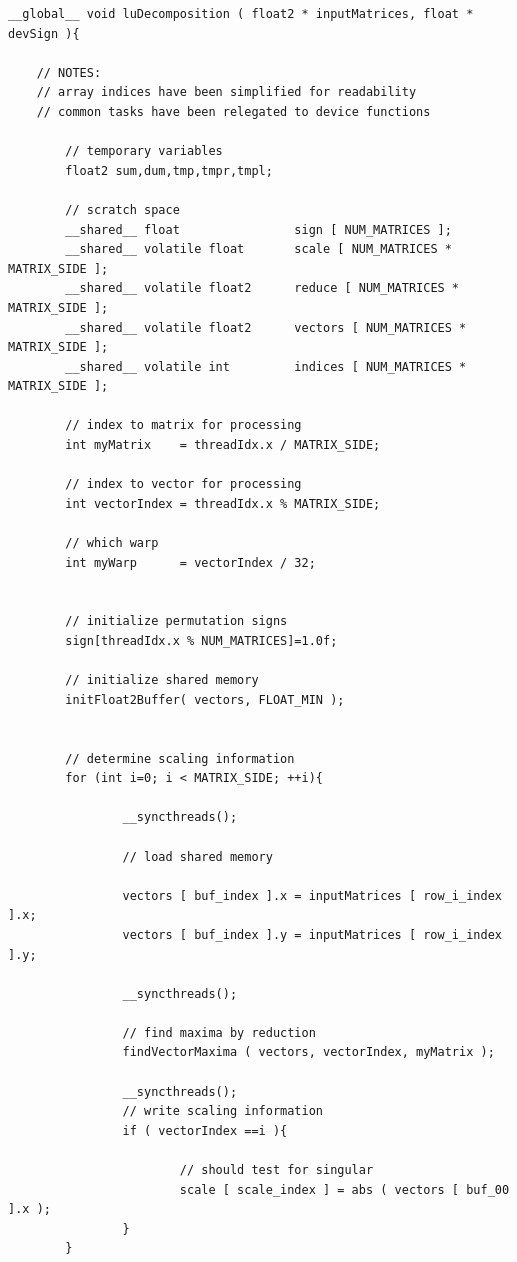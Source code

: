 \documentclass[letter, 12pt]{article}
\begin{document}
\begingroup
\fontsize{6pt}{6pt}\selectfont
\begin{verbatim}
__global__ void luDecomposition ( float2 * inputMatrices, float * devSign ){

	// NOTES:
	// array indices have been simplified for readability
	// common tasks have been relegated to device functions	

        // temporary variables
        float2 sum,dum,tmp,tmpr,tmpl;

        // scratch space
        __shared__ float                sign [ NUM_MATRICES ];
        __shared__ volatile float       scale [ NUM_MATRICES * MATRIX_SIDE ];
        __shared__ volatile float2      reduce [ NUM_MATRICES * MATRIX_SIDE ];
        __shared__ volatile float2      vectors [ NUM_MATRICES * MATRIX_SIDE ];
        __shared__ volatile int         indices [ NUM_MATRICES * MATRIX_SIDE ];

        // index to matrix for processing
        int myMatrix    = threadIdx.x / MATRIX_SIDE;

        // index to vector for processing
        int vectorIndex = threadIdx.x % MATRIX_SIDE;

        // which warp 
        int myWarp      = vectorIndex / 32;


        // initialize permutation signs
        sign[threadIdx.x % NUM_MATRICES]=1.0f;

        // initialize shared memory
        initFloat2Buffer( vectors, FLOAT_MIN );


        // determine scaling information
        for (int i=0; i < MATRIX_SIDE; ++i){

                __syncthreads();

                // load shared memory

                vectors [ buf_index ].x = inputMatrices [ row_i_index ].x;
                vectors [ buf_index ].y = inputMatrices [ row_i_index ].y;

                __syncthreads();

                // find maxima by reduction
                findVectorMaxima ( vectors, vectorIndex, myMatrix );

                __syncthreads();
                // write scaling information
                if ( vectorIndex ==i ){

                        // should test for singular
                        scale [ scale_index ] = abs ( vectors [ buf_00 ].x );
                }
        }


\end{verbatim}
\end{document}
